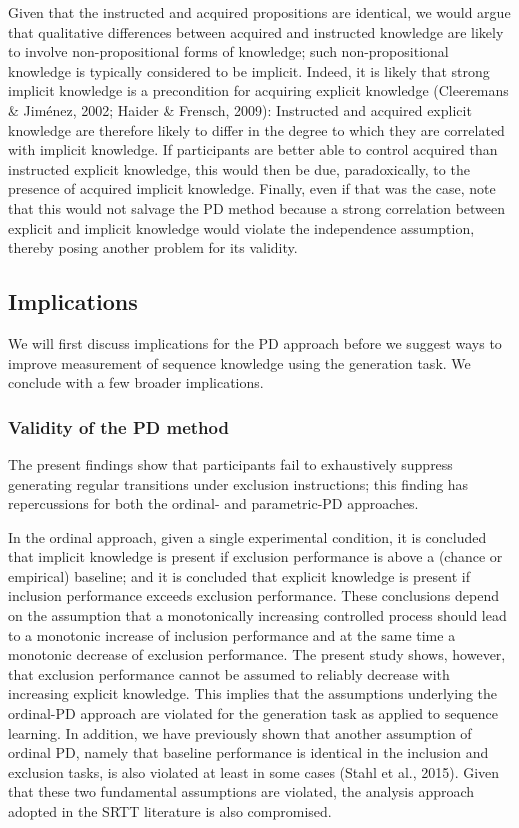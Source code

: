 \documentclass[man]{apa6}
\theoremstyle{definition}
\theoremstyle{definition}
\theoremstyle{definition}
\theoremstyle{remark}
\begin{document}
Given that the instructed and acquired propositions are identical, we
would argue that qualitative differences between acquired and instructed
knowledge are likely to involve non-propositional forms of knowledge;
such non-propositional knowledge is typically considered to be implicit.
Indeed, it is likely that strong implicit knowledge is a precondition
for acquiring explicit knowledge (Cleeremans \& Jiménez, 2002; Haider \&
Frensch, 2009): Instructed and acquired explicit knowledge are therefore
likely to differ in the degree to which they are correlated with
implicit knowledge. If participants are better able to control acquired
than instructed explicit knowledge, this would then be due,
paradoxically, to the presence of acquired implicit knowledge. Finally,
even if that was the case, note that this would not salvage the PD
method because a strong correlation between explicit and implicit
knowledge would violate the independence assumption, thereby posing
another problem for its validity.

\subsection{Implications}\label{implications}

We will first discuss implications for the PD approach before we suggest
ways to improve measurement of sequence knowledge using the generation
task. We conclude with a few broader implications.

\subsubsection{Validity of the PD
method}\label{validity-of-the-pd-method}

The present findings show that participants fail to exhaustively
suppress generating regular transitions under exclusion instructions;
this finding has repercussions for both the ordinal- and parametric-PD
approaches.

In the ordinal approach, given a single experimental condition, it is
concluded that implicit knowledge is present if exclusion performance is
above a (chance or empirical) baseline; and it is concluded that
explicit knowledge is present if inclusion performance exceeds exclusion
performance. These conclusions depend on the assumption that a
monotonically increasing controlled process should lead to a monotonic
increase of inclusion performance and at the same time a monotonic
decrease of exclusion performance. The present study shows, however,
that exclusion performance cannot be assumed to reliably decrease with
increasing explicit knowledge. This implies that the assumptions
underlying the ordinal-PD approach are violated for the generation task
as applied to sequence learning. In addition, we have previously shown
that another assumption of ordinal PD, namely that baseline performance
is identical in the inclusion and exclusion tasks, is also violated at
least in some cases (Stahl et al., 2015). Given that these two
fundamental assumptions are violated, the analysis approach adopted in
the SRTT literature is also compromised.
\end{document}

